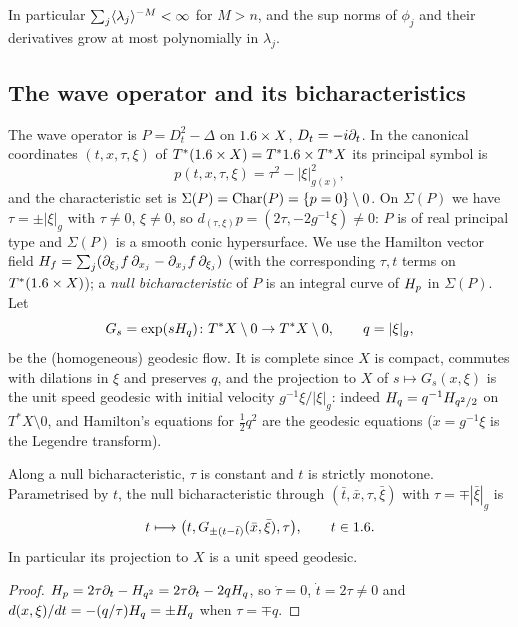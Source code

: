 In particular $\sum_j\langle \lambda_j\rangle^{-M}<\infty$ for $M>n$, and the sup norms
of $\phi_j$ and their derivatives grow at most polynomially in $\lambda_j$.

\subsection{The wave operator and its bicharacteristics}

The wave operator is $P=D_t^2-\Delta$ on $1.6\times X$, $D_t=-i\partial_t$. In the
canonical coordinates $(t,x,\tau,\xi)$ of $T^*(1.6\times X)=T^*1.6\times T^*X$
its principal symbol is
\begin{equation*}
p(t,x,\tau,\xi)=\tau^2-|\xi|^2_{g(x)},
\end{equation*}
and the characteristic set is $\Sigma(P)=\operatorname{Char}(P)=\{p=0\}\setminus0$. On
$\Sigma(P)$ we have $\tau=\pm|\xi|_g$ with $\tau\ne0$, $\xi\ne0$, so
$d_{(\tau,\xi)}p=(2\tau,-2g^{-1}\xi)\ne0$: $P$ is of real principal type and
$\Sigma(P)$ is a smooth conic hypersurface. We use the Hamilton vector field
$H_{f}=\sum_j(\partial_{\xi_j}f\,\partial_{x_j}-\partial_{x_j}f\,\partial_{\xi_j})$ (with the
corresponding $\tau,t$ terms on $T^*(1.6\times X)$); a \emph{null bicharacteristic}
of $P$ is an integral curve of $H_{p}$ in $\Sigma(P)$. Let
\begin{equation*}
G_s=\exp(sH_{q})\colon T^*X\setminus0\to T^*X\setminus0,\qquad q=|\xi|_g,
\end{equation*}
be the (homogeneous) geodesic flow. It is complete since $X$ is compact,
commutes with dilations in $\xi$ and preserves $q$, and the projection to $X$ of
$s\mapsto G_s(x,\xi)$ is the unit speed geodesic with initial velocity
$g^{-1}\xi/|\xi|_g$: indeed $H_{q}=q^{-1}H_{q^2/2}$ on $T^*X\setminus0$,
and Hamilton's equations for $\frac12q^2$ are the geodesic equations
($\dot x=g^{-1}\xi$ is the Legendre transform).

\begin{lemma}\label{wave:lem:bichar}
Along a null bicharacteristic, $\tau$ is constant and $t$ is strictly monotone.
Parametrised by $t$, the null bicharacteristic through $(\bar t,\bar x,\tau,\bar\xi)$ with
$\tau=\mp|\bar\xi|_g$ is
\begin{equation*}
t\longmapsto\big(t,G_{\pm(t-\bar t)}(\bar x,\bar\xi),\tau\big),\qquad t\in1.6 .
\end{equation*}
In particular its projection to $X$ is a unit speed geodesic.
\end{lemma}
\begin{proof}
$H_{p}=2\tau\partial_t-H_{q^2}=2\tau\partial_t-2qH_{q}$, so $\dot\tau=0$, $\dot t=2\tau\ne0$
and $d(x,\xi)/dt=-(q/\tau)H_{q}=\pm H_{q}$ when $\tau=\mp q$.
\end{proof}

